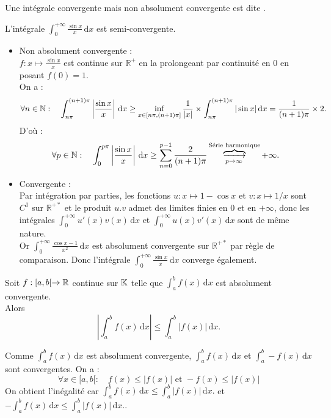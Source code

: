 \documentclass{book}
\begin{document}
\begin{Definition}
Une intégrale convergente mais non absolument convergente est dite .
\end{Definition}
\begin{Exemple}
L'intégrale $\int_0^{+\infty } \frac{\sin x}{x}\,\mathrm dx$ est semi-convergente.
\begin{itemize}
\item Non absolument convergente :\\
$f : x \mapsto \frac{\sin x}{x}$ est continue sur $\mathbb R^+$ en la prolongeant par continuité en $0$ en posant $f (0) = 1$.\\
On a :
$$\forall n \in  \mathbb{N}:\quad \int_{n\pi}^{(n+1)\pi}\left|\frac{\sin x}{x}\right|\,\mathrm dx \geq \inf_{x\in [n\pi,(n+1)\pi] }\frac{1}{|x|}\times  \int_{n\pi}^{(n+1)\pi} |\sin x|  \,\mathrm dx  =\frac{1}{(n+1)\pi}\times 2.$$
D'où : 
$$\forall p \in   \mathbb{N} :\quad \int_{0}^{p\pi}\left|\frac{\sin x}{x}\right|\,\mathrm dx  \geq \sum_{n=0}^{p-1}\frac{2}{(n+1)\pi}\overbrace{\xrightarrow[p\to\infty]{}}^{\text{Série harmonique}}+\infty . $$
\item Convergente :\\
Par intégration par parties,  les fonctions $u : x \mapsto 1 - \cos x$ et $v : x \mapsto 1/x$ sont $C^1$ sur $\mathbb R^{+*}$ et le produit $u.v$ admet des limites finies en 0 et en $+\infty$, donc les intégrales $\int_{0}^{+\infty}u'(x)v(x)\,\mathrm dx$ et $\int_{0}^{+\infty}u(x)v'(x)\,\mathrm dx$ sont de même nature.\\
Or $\int_0^{+\infty } \frac{\cos x-1}{x^2}\,\mathrm dx$ est absolument convergente sur $\mathbb R^{+*}$ par règle de comparaison. Donc l'intégrale  $\int_0^{+\infty } \frac{\sin x}{x} \,\mathrm dx$ converge également. 
\end{itemize}
\end{Exemple}
\begin{Proposition}
Soit $f : [a,b [\to \mathbb{R}$ continue sur $\mathbb{K}$ telle que $\int_a^b f(x)\,\mathrm dx$ est absolument convergente.
\\
Alors 
$$\left| \int_a^b f(x)\,\mathrm dx \right| \leq  \int_a^b \left| f(x) \right| \,\mathrm dx.$$
\end{Proposition}
\begin{Demonstration}
Comme $\int_a^b f(x)\,\mathrm dx$ est absolument convergente,  $\int_a^b f(x)\,\mathrm dx$ et  $\int_a^b -f(x)\,\mathrm dx$ sont convergentes. On a :
$$\forall x \in [a,b[:\quad f(x)\leq |f(x)| \text{ et } -f(x)\leq |f(x)| $$
On obtient l'inégalité car  $ \int_a^b f(x)\,\mathrm dx \leq  \int_a^b \left| f(x) \right| \,\mathrm dx.$ et $- \int_a^b f(x)\,\mathrm dx \leq  \int_a^b \left| f(x) \right| \,\mathrm dx.$.
\end{Demonstration}
\end{document}
